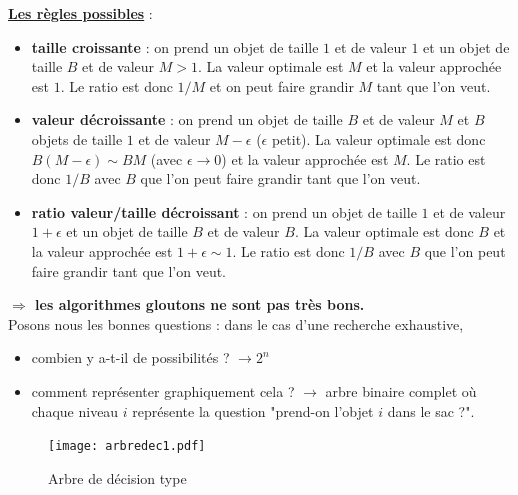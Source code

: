\documentclass[12pt]{article}
\begin{document}
\textbf{\underline{Les règles possibles}} :
\begin{itemize}
\item \textbf{taille croissante} : on prend un objet de taille $1$ et de valeur $1$ et un objet de taille $B$ et de valeur $M>1$. La valeur
optimale est $M$ et la valeur approchée est $1$. Le ratio est donc $1/M$ et on peut faire grandir $M$ tant que l'on veut.
\item \textbf{valeur décroissante} : on prend un objet de taille $B$ et de valeur $M$ et $B$ objets de taille $1$ et de valeur $M-\epsilon$
($\epsilon$ petit). La valeur optimale est donc $B(M-\epsilon) \sim BM$ (avec $\epsilon\to 0$) et la valeur approchée est $M$. Le ratio est
donc $1/B$ avec $B$ que l'on peut faire grandir tant que l'on veut.
\item \textbf{ratio valeur/taille décroissant} : on prend un objet de taille $1$ et de valeur $1+\epsilon$ et un objet de taille $B$ et de
valeur $B$. La valeur optimale est donc $B$ et la valeur approchée est $1+\epsilon\sim 1$. Le ratio est donc $1/B$ avec $B$ que l'on peut
faire grandir tant que l'on veut.
\end{itemize}

\textbf{$\Rightarrow$ les algorithmes gloutons ne sont pas très bons.} \\

\noindent Posons nous les bonnes questions : dans le cas d'une recherche exhaustive,
\begin{itemize}
\item combien y a-t-il de possibilités ? $\rightarrow 2^n$
\item comment représenter graphiquement cela ? $\rightarrow$ arbre binaire complet où chaque niveau $i$ représente la question "prend-on
l'objet $i$ dans le sac ?".
\end{itemize}

\begin{figure}[H]
    \begin{center}
    \texttt{[image: arbredec1.pdf]}
    \caption{Arbre de décision type}
    \end{center}
\end{figure}
\end{document}
